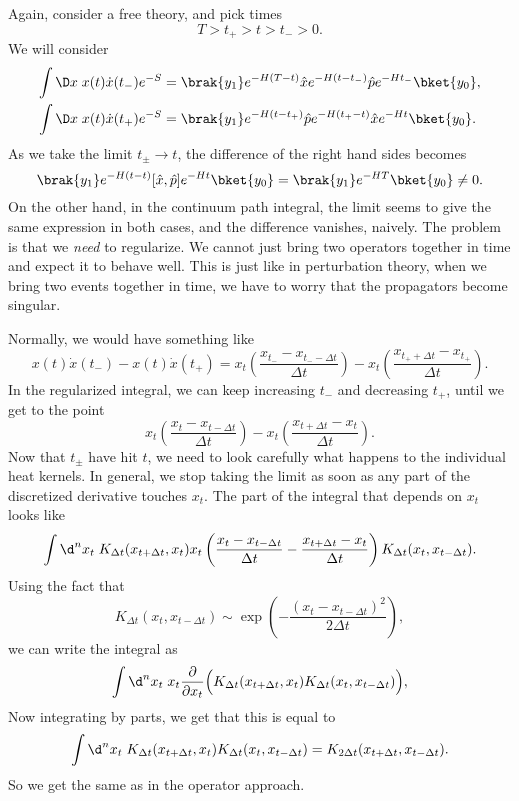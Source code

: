 \documentclass[a4paper]{article}
\begin{document}
Again, consider a free theory, and pick times
\[
  T > t_+ > t > t_- > 0.
\]
We will consider
\begin{align*}
  \int \D x\; x(t) \dot{x}(t_-) e^{-S} &= \brak{y_1} e^{-H(T - t)} \hat{x} e^{-H(t - t_-)} \hat{p} e^{-H t_-} \bket{y_0},\\
  \int \D x\; x(t) \dot{x}(t_+) e^{-S} &= \brak{y_1} e^{-H(t - t_+)} \hat{p} e^{-H (t_+ - t)} \hat{x} e^{-Ht}\bket{y_0}.
\end{align*}
As we take the limit $t_{\pm} \to t$, the difference of the right hand sides becomes
\[
  \brak{y_1} e^{-H(t - t) }[\hat{x}, \hat{p}] e^{-H t}\bket{y_0} = \brak{y_1} e^{-HT} \bket{y_0} \not= 0.
\]
On the other hand, in the continuum path integral, the limit seems to give the same expression in both cases, and the difference vanishes, naively. The problem is that we \emph{need} to regularize. We cannot just bring two operators together in time and expect it to behave well. This is just like in perturbation theory, when we bring two events together in time, we have to worry that the propagators become singular.

Normally, we would have something like
\[
  x(t) \dot{x}(t_-) - x(t) \dot{x}(t_+) = x_t \left(\frac{x_{t_-} - x_{t_- - \Delta t}}{\Delta t}\right) - x_t \left(\frac{x_{t_+ + \Delta t} - x_{t_+}}{ \Delta t}\right).
\]
In the regularized integral, we can keep increasing $t_-$ and decreasing $t_+$, until we get to the point
\[
  x_t \left(\frac{x_t - x_{t - \Delta t}}{\Delta t}\right) - x_t \left(\frac{x_{t + \Delta t} - x_t}{ \Delta t}\right).
\]
Now that $t_{\pm}$ have hit $t$, we need to look carefully what happens to the individual heat kernels. In general, we stop taking the limit as soon as any part of the discretized derivative touches $x_t$. The part of the integral that depends on $x_t$ looks like
\[
  \int \d^n x_t\; K_{\Delta t}(x_{t + \Delta t}, x_t) x_t \left(\frac{x_t - x_{t - \Delta t}}{\Delta t} - \frac{x_{t + \Delta t} - x_t}{ \Delta t}\right) K_{\Delta t} (x_t, x_{t - \Delta t}).
\]
Using the fact that
\[
  K_{\Delta t}(x_t, x_{t - \Delta t}) \sim \exp\left(- \frac{(x_t - x_{t - \Delta t})^2}{2\Delta t}\right),
\]
we can write the integral as
\[
  \int \d^n x_t \; x_t \frac{\partial}{\partial x_t} \Big(K_{\Delta t}(x_{t + \Delta t}, x_t) K_{\Delta t}(x_t, x_{t - \Delta t})\Big),
\]
Now integrating by parts, we get that this is equal to
\[
  \int \d^n x_t\; K_{\Delta t} (x_{t + \Delta t}, x_t) K_{\Delta t} (x_t, x_{t - \Delta t}) = K_{2 \Delta t} (x_{t + \Delta t}, x_{t - \Delta t}).
\]
So we get the same as in the operator approach.
\end{document}
